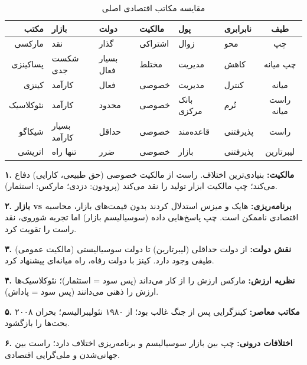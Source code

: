 \begin{table}[htbp]
\centering
\caption{مقایسه مکاتب اقتصادی اصلی}
\label{tab:economic-schools}
\footnotesize %
\begin{tabularx}{\linewidth}{r|>{\centering\arraybackslash}X|>{\centering\arraybackslash}X|>{\centering\arraybackslash}X|>{\centering\arraybackslash}X|>{\centering\arraybackslash}X|c}
\toprule
\textbf{مکتب} & \textbf{بازار} & \textbf{دولت} & \textbf{مالکیت} & \textbf{پول} & \textbf{نابرابری} & \textbf{طیف} \\
\midrule
مارکسی & نقد & گذار & اشتراکی & زوال & محو & چپ \\
\midrule
پساکینزی & شکست جدی & بسیار فعال & مختلط & مدیریت & کاهش & چپ میانه \\
\midrule
کینزی & کارآمد & فعال & خصوصی & مدیریت & کنترل & میانه \\
\midrule
نئوکلاسیک & کارآمد & محدود & خصوصی & بانک مرکزی & نُرم & راست میانه \\
\midrule
شیکاگو & بسیار کارآمد & حداقل & خصوصی & قاعده‌مند & پذیرفتنی & راست \\
\midrule
اتریشی & تنها راه & ضرر & خصوصی & بازار & پذیرفتنی & لیبرتارین \\
\bottomrule
\end{tabularx}
\end{table}


\newpage

\begin{summarybox}

\textbf{۱. مالکیت:} بنیادی‌ترین اختلاف. راست از مالکیت خصوصی (حق طبیعی، کارایی) دفاع می‌کند؛ چپ مالکیت ابزار تولید را نقد می‌کند (پرودون: دزدی؛ مارکس: استثمار).

\textbf{۲. بازار vs برنامه‌ریزی:} هایک و میزس استدلال کردند بدون قیمت‌های بازار، محاسبه اقتصادی ناممکن است. چپ پاسخ‌هایی داده (سوسیالیسم بازار) اما تجربه شوروی، نقد راست را تقویت کرد.

\textbf{۳. نقش دولت:} از دولت حداقلی (لیبرتارین) تا دولت سوسیالیستی (مالکیت عمومی) طیفی وجود دارد. کینز با دولت رفاه، راه میانه‌ای پیشنهاد کرد.

\textbf{۴. نظریه ارزش:} مارکس ارزش را از کار می‌داند (پس سود = استثمار)؛ نئوکلاسیک‌ها ارزش را ذهنی می‌دانند (پس سود = پاداش).

\textbf{۵. مکاتب معاصر:} کینزگرایی پس از جنگ غالب بود؛ از ۱۹۸۰ نئولیبرالیسم؛ بحران ۲۰۰۸ بحث‌ها را بازگشود.

\textbf{۶. اختلافات درونی:} چپ بین بازار سوسیالیسم و برنامه‌ریزی اختلاف دارد؛ راست بین جهانی‌شدن و ملی‌گرایی اقتصادی.

\end{summarybox}

